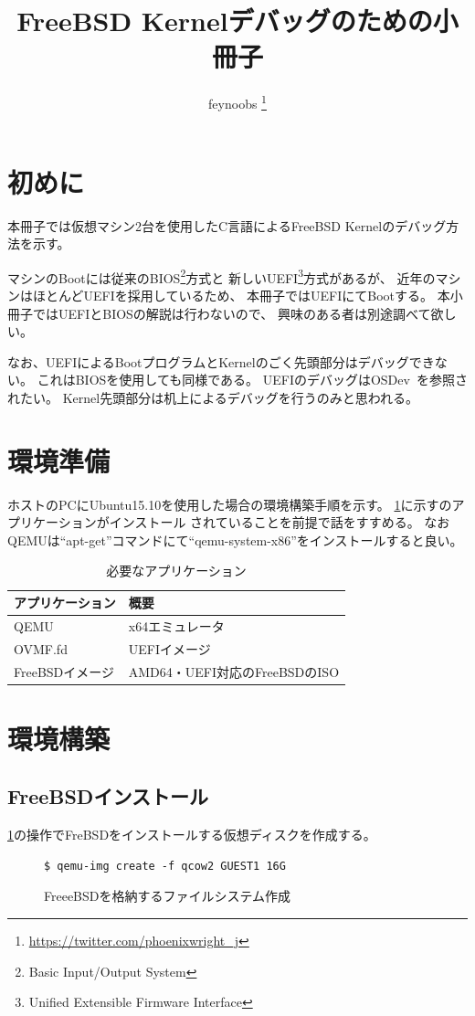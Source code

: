 \documentclass[a4j]{jarticle}
\title{FreeBSD Kernelデバッグのための小冊子}
\author{feynoobs \thanks{\protect\url{https://twitter.com/phoenixwright_j}}}
\begin{document}
\maketitle

\tableofcontents

\newpage

\section{初めに}
本冊子では仮想マシン2台を使用したC言語によるFreeBSD Kernelのデバッグ方法を示す。

マシンのBootには従来のBIOS\footnote{Basic Input/Output System}方式と
新しいUEFI\footnote{Unified Extensible Firmware Interface}方式があるが、
近年のマシンはほとんどUEFIを採用しているため、
本冊子ではUEFIにてBootする。
本小冊子ではUEFIとBIOSの解説は行わないので、
興味のある者は別途調べて欲しい。

なお、UEFIによるBootプログラムとKernelのごく先頭部分はデバッグできない。
これはBIOSを使用しても同様である。
UEFIのデバッグはOSDev~\cite{OSDev}を参照されたい。
Kernel先頭部分は机上によるデバッグを行うのみと思われる。

\section{環境準備}
ホストのPCにUbuntu15.10を使用した場合の環境構築手順を示す。
\ref{tb:FreeBSD:_ENV}に示すのアプリケーションがインストール
されていることを前提で話をすすめる。
なおQEMUは``apt-get''コマンドにて``qemu-system-x86''をインストールすると良い。
\begin{table}[htp]
	\caption{必要なアプリケーション}
	\label{tb:FreeBSD:_ENV}
	\centering
	\begin{tabular}{|l|p{10cm}|}									\hline
		アプリケーション	&	概要							\\	\hline	\hline
		QEMU				&	x64エミュレータ				\\	\hline
		OVMF.fd				&	UEFIイメージ					\\	\hline
		FreeBSDイメージ		&	AMD64・UEFI対応のFreeBSDのISO	\\	\hline
	\end{tabular}
\end{table}

\section{環境構築}
\subsection{FreeBSDインストール}
\label{sec:FreeBSD_inst}
\ref{fig:FreeBSD_CREATE}の操作でFreBSDをインストールする仮想ディスクを作成する。
\begin{figure}[htbp]
	\centering
	\begin{lstlisting}[basicstyle=\ttfamily\footnotesize, frame=single, breaklines=true]
$ qemu-img create -f qcow2 GUEST1 16G
	\end{lstlisting}
	\caption{FreeeBSDを格納するファイルシステム作成}
	\label{fig:FreeBSD_CREATE}
\end{figure}
\end{document}
